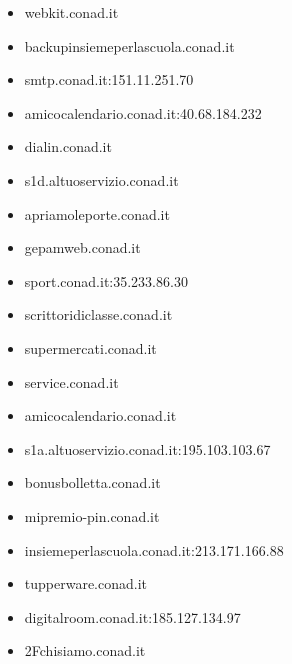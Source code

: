 \documentclass{article}
\begin{document}
\begin{itemize}
    
        \item webkit.conad.it
    
        \item backupinsiemeperlascuola.conad.it
    
        \item smtp.conad.it:151.11.251.70
    
        \item amicocalendario.conad.it:40.68.184.232
    
        \item dialin.conad.it
    
        \item s1d.altuoservizio.conad.it
    
        \item apriamoleporte.conad.it
    
        \item gepamweb.conad.it
    
        \item sport.conad.it:35.233.86.30
    
        \item scrittoridiclasse.conad.it
    
        \item supermercati.conad.it
    
        \item service.conad.it
    
        \item amicocalendario.conad.it
    
        \item s1a.altuoservizio.conad.it:195.103.103.67
    
        \item bonusbolletta.conad.it
    
        \item mipremio-pin.conad.it
    
        \item insiemeperlascuola.conad.it:213.171.166.88
    
        \item tupperware.conad.it
    
        \item digitalroom.conad.it:185.127.134.97
    
        \item 2Fchisiamo.conad.it
    

\end{itemize}
\end{document}
